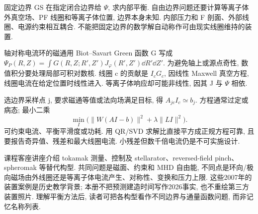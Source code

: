 \label{ch:pf}
固定边界 GS 在指定闭合边界给 \ensuremath{\Psi}, 求内部平衡. 自由边界问题还要计算等离子体外真空场、PF 线圈和等离子体位置, 边界本身未知. 内部压力和 F 剖面、外部线圈、电源约束相互耦合. 不能把固定边界的数学解自动称作可由现实线圈维持的装置.

轴对称电流环的磁通用 Biot--Savart Green 函数 G 写成 $\Psi_P(R,Z)=\int G(R,Z;R',Z')J_\varphi(R',Z')\dd R'\dd Z'$. 为避免轴上或源点奇性, 数值积分要处理局部可积对数核. 线圈 c 的贡献是 $I_cG_c$, 因线性 Maxwell 真空方程, 线圈电流在给定位置时线性进入. 等离子体响应却可能非线性, 因其 J 与 \ensuremath{\Psi} 相依.

选边界采样点 j, 要求磁通等值或法向场满足目标, 得 $A_{jc}I_c\simeq b_j$. 方程通常过定或病态; 最小二乘 \begin{equation}\min_I\bigl(\|W(AI-b)\|^2+\lambda\|LI\|^2\bigr).\end{equation} 可约束电流、平衡平滑度或功耗. 用 QR/SVD 求解比直接平方成正规方程可靠, 且要报告奇异值、残差和最大线圈电流. 小残差但数千倍电流仍是不可实施设计.

课程客座讲座介绍 tokamak 测量、控制及 stellarator、reversed-field pinch、spheromak 等替代构型. 共同问题是磁面、约束和 MHD 自由能, 不同点是环向/极向磁场由外线圈还是等离子体电流产生、对称性、变换和压力上限. 这些2007年的装置案例是历史教学背景; 本册不把预测建造时间写作2026事实, 也不重绘第三方装置照片. 理解平衡方法后, 读者可把各构型看作不同边界与通量函数问题, 而非记忆名称列表.

